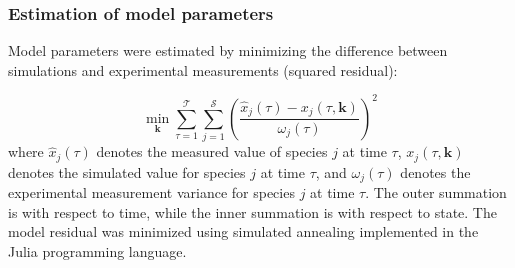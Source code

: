 \documentclass[10pt,twocolumn,twoside,final]{IEEEtran}
\begin{document}
\subsubsection*{Estimation of model parameters}
Model parameters were estimated by minimizing the difference between simulations and experimental measurements (squared residual):

\begin{equation}\label{eqn:objective-function}\nonumber
	\min_{\mathbf{k}} \sum_{\tau=1}^{\mathcal{T}}\sum_{j=1}^{\mathcal{S}}\left(\frac{\hat{x}_{j}\left(\tau\right) - x_{j}\left(\tau,\mathbf{k}\right)}{\omega_{j}\left(\tau\right)}\right)^{2}
\end{equation}
where $\hat{x}_{j}\left(\tau\right)$ denotes the measured value of species $j$ at time $\tau$, $x_{j}\left(\tau,\mathbf{k}\right)$ denotes the simulated
value for species $j$ at time $\tau$, and $\omega_{j}\left(\tau\right)$ denotes the experimental measurement variance for species $j$ at time $\tau$.
The outer summation is with respect to time, while the inner summation is with respect to state. The model residual was minimized using simulated annealing implemented in the Julia programming language.



\end{document}
